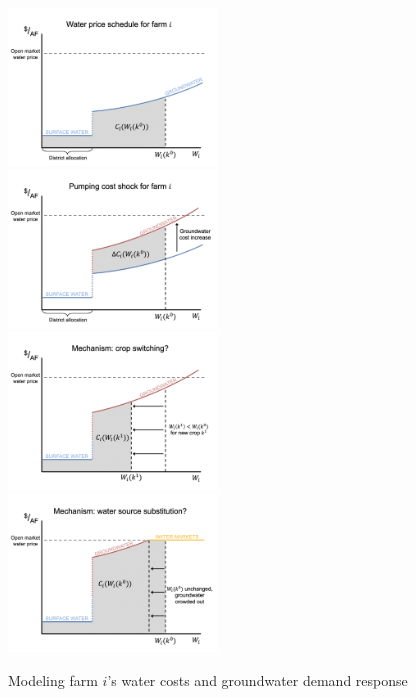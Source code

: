 \documentclass[hidelinks,12pt]{article}
\begin{document}
\begin{figure}[t]
\begin{centering}
\caption{Modeling farm $i$'s water costs and groundwater demand response}
\label{fig:water_cost_cartoons}
\includegraphics[width=0.495\textwidth, trim={4mm 0 11mm 0mm}, clip]{Figures/water_cost_1.png}
\includegraphics[width=0.495\textwidth, trim={4mm 0 11mm 0mm}, clip]{Figures/water_cost_2.png} \\
\includegraphics[width=0.495\textwidth, trim={4mm 0 11mm 0mm}, clip]{Figures/water_cost_3.png}
\includegraphics[width=0.495\textwidth, trim={4mm 0 11mm 0mm}, clip]{Figures/water_cost_4.png}

\end{centering}
\end{figure}
\end{document}
